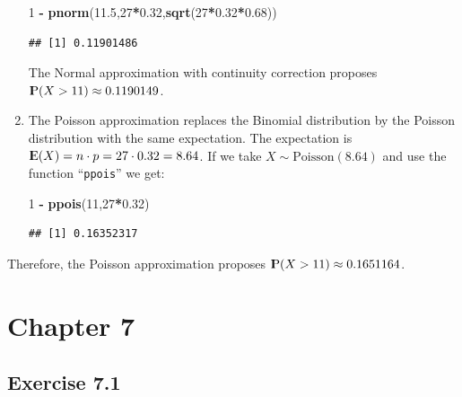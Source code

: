 \documentclass[]{krantz}
\makeatletter
\newenvironment{Shaded}{\begin{snugshade}}{\end{snugshade}}
\newcommand{\KeywordTok}[1]{\textcolor[rgb]{0.13,0.29,0.53}{\textbf{#1}}}
\newcommand{\DecValTok}[1]{\textcolor[rgb]{0.00,0.00,0.81}{#1}}
\newcommand{\FloatTok}[1]{\textcolor[rgb]{0.00,0.00,0.81}{#1}}
\newcommand{\StringTok}[1]{\textcolor[rgb]{0.31,0.60,0.02}{#1}}
\newcommand{\OperatorTok}[1]{\textcolor[rgb]{0.81,0.36,0.00}{\textbf{#1}}}
\newcommand{\NormalTok}[1]{#1}
\newcommand{\Expec}{{\rm I\kern-.3em E}}
\newcommand{\Prob}{{\rm I\kern-.3em P}}
\newenvironment{kframe}{%
\medskip{}
\setlength{\fboxsep}{.8em}
 \def\at@end@of@kframe{}%
 \ifinner\ifhmode%
  \def\at@end@of@kframe{\end{minipage}}%
  \begin{minipage}{\columnwidth}%
 \fi\fi%
 \def\FrameCommand##1{\hskip\@totalleftmargin \hskip-\fboxsep
 \colorbox{shadecolor}{##1}\hskip-\fboxsep
     \hskip-\linewidth \hskip-\@totalleftmargin \hskip\columnwidth}%
 \MakeFramed {\advance\hsize-\width
   \@totalleftmargin\z@ \linewidth\hsize
   \@setminipage}}%
 {\par\unskip\endMakeFramed%
 \at@end@of@kframe}
\renewenvironment{Shaded}{\begin{kframe}}{\end{kframe}}
\theoremstyle{definition}
\theoremstyle{definition}
\theoremstyle{definition}
\theoremstyle{remark}
\makeatother
\begin{document}
\begin{enumerate}
\begin{Shaded}
\begin{Highlighting}[]
\DecValTok{1} \OperatorTok{-}\StringTok{ }\KeywordTok{pnorm}\NormalTok{(}\FloatTok{11.5}\NormalTok{,}\DecValTok{27}\OperatorTok{*}\FloatTok{0.32}\NormalTok{,}\KeywordTok{sqrt}\NormalTok{(}\DecValTok{27}\OperatorTok{*}\FloatTok{0.32}\OperatorTok{*}\FloatTok{0.68}\NormalTok{))}
\end{Highlighting}
\end{Shaded}

\begin{verbatim}
## [1] 0.11901486
\end{verbatim}

  The Normal approximation with continuity correction proposes
  \(\Prob(X > 11) \approx 0.1190149\).
\item
  The Poisson approximation replaces the Binomial distribution by the
  Poisson distribution with the same expectation. The expectation is
  \(\Expec(X) = n \cdot p = 27 \cdot 0.32 = 8.64\). If we take
  \(X \sim \mbox{Poisson}(8.64)\) and use the function
  ``\texttt{ppois}'' we get:

\begin{Shaded}
\begin{Highlighting}[]
\DecValTok{1} \OperatorTok{-}\StringTok{ }\KeywordTok{ppois}\NormalTok{(}\DecValTok{11}\NormalTok{,}\DecValTok{27}\OperatorTok{*}\FloatTok{0.32}\NormalTok{)}
\end{Highlighting}
\end{Shaded}

\begin{verbatim}
## [1] 0.16352317
\end{verbatim}
\end{enumerate}

Therefore, the Poisson approximation proposes
\(\Prob(X > 11) \approx 0.1651164\).

\section*{Chapter 7}\label{chapter-7}


\subsection*{Exercise 7.1}\label{exercise-7.1}
\end{document}
